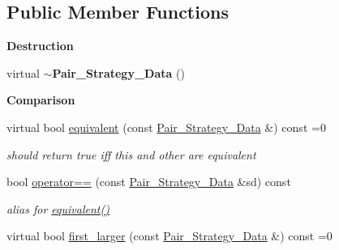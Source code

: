 \subsection*{Public Member Functions}
\begin{Indent}\textbf{ Destruction}\par
\begin{DoxyCompactItemize}
\item 
\mbox{\label{class_pair___strategy___data_a177d4749902d7c94d8e48340a64d87b7}} 
virtual {\bfseries $\sim$\+Pair\+\_\+\+Strategy\+\_\+\+Data} ()
\end{DoxyCompactItemize}
\end{Indent}
\begin{Indent}\textbf{ Comparison}\par
\begin{DoxyCompactItemize}
\item 
\mbox{\label{class_pair___strategy___data_ae29822eaf584f1f9654c4ec821734279}} 
virtual bool \hyperlink{class_pair___strategy___data_ae29822eaf584f1f9654c4ec821734279}{equivalent} (const \hyperlink{class_pair___strategy___data}{Pair\+\_\+\+Strategy\+\_\+\+Data} \&) const =0
\begin{DoxyCompactList}\small\item\em should return {\ttfamily true} iff {\ttfamily this} and other are equivalent \end{DoxyCompactList}\item 
\mbox{\label{class_pair___strategy___data_a41f03829d564520427fb9405aefe41be}} 
bool \hyperlink{class_pair___strategy___data_a41f03829d564520427fb9405aefe41be}{operator==} (const \hyperlink{class_pair___strategy___data}{Pair\+\_\+\+Strategy\+\_\+\+Data} \&sd) const
\begin{DoxyCompactList}\small\item\em alias for \hyperlink{class_pair___strategy___data_ae29822eaf584f1f9654c4ec821734279}{equivalent()} \end{DoxyCompactList}\item 
\mbox{\label{class_pair___strategy___data_a272edeb1893af886b4449d7bcb799cdb}} 
virtual bool \hyperlink{class_pair___strategy___data_a272edeb1893af886b4449d7bcb799cdb}{first\+\_\+larger} (const \hyperlink{class_pair___strategy___data}{Pair\+\_\+\+Strategy\+\_\+\+Data} \&) const =0

\end{DoxyCompactItemize}
\end{Indent}
